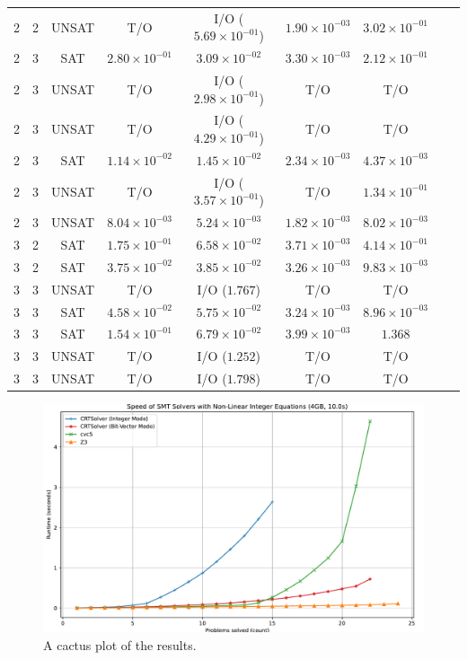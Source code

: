 \begin{table}
\begin{tabular}{ccccccccc}
2 & 2 & UNSAT & T/O & I/O ($5.69 \times 10^{-01}$) & $1.90 \times 10^{-03}$ & $3.02 \times 10^{-01}$ \\
2 & 3 & SAT & $2.80 \times 10^{-01}$ & $3.09 \times 10^{-02}$ & $3.30 \times 10^{-03}$ & $2.12 \times 10^{-01}$ \\
2 & 3 & UNSAT & T/O & I/O ($2.98 \times 10^{-01}$) & T/O & T/O \\
2 & 3 & UNSAT & T/O & I/O ($4.29 \times 10^{-01}$) & T/O & T/O \\
2 & 3 & SAT & $1.14 \times 10^{-02}$ & $1.45 \times 10^{-02}$ & $2.34 \times 10^{-03}$ & $4.37 \times 10^{-03}$ \\
2 & 3 & UNSAT & T/O & I/O ($3.57 \times 10^{-01}$) & T/O & $1.34 \times 10^{-01}$ \\
2 & 3 & UNSAT & $8.04 \times 10^{-03}$ & $5.24 \times 10^{-03}$ & $1.82 \times 10^{-03}$ & $8.02 \times 10^{-03}$ \\
3 & 2 & SAT & $1.75 \times 10^{-01}$ & $6.58 \times 10^{-02}$ & $3.71 \times 10^{-03}$ & $4.14 \times 10^{-01}$ \\
3 & 2 & SAT & $3.75 \times 10^{-02}$ & $3.85 \times 10^{-02}$ & $3.26 \times 10^{-03}$ & $9.83 \times 10^{-03}$ \\
3 & 3 & UNSAT & T/O & I/O ($1.767$) & T/O & T/O \\
3 & 3 & SAT & $4.58 \times 10^{-02}$ & $5.75 \times 10^{-02}$ & $3.24 \times 10^{-03}$ & $8.96 \times 10^{-03}$ \\
3 & 3 & SAT & $1.54 \times 10^{-01}$ & $6.79 \times 10^{-02}$ & $3.99 \times 10^{-03}$ & $1.368$ \\
3 & 3 & UNSAT & T/O & I/O ($1.252$) & T/O & T/O \\
3 & 3 & UNSAT & T/O & I/O ($1.798$) & T/O & T/O \\
  \bottomrule
\end{tabular}
\end{table}



\begin{figure}
    \vspace{4em}
    \centering
    \includegraphics[width=1.0\linewidth]{cactus.pdf}
  \caption{A cactus plot of the results.}
  \label{figure:cactus-plot}
\end{figure}

